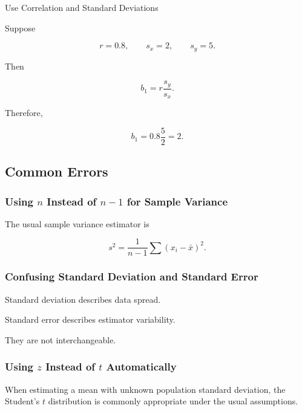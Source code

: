\begin{workedexamplebox}{Use Correlation and Standard Deviations}

Suppose

\[
r=0.8,
\qquad
s_x=2,
\qquad
s_y=5.
\]

Then

\[
b_1
=
r
\frac{s_y}{s_x}.
\]

Therefore,

\begin{answerbox}
\[
\boxed{
b_1
=
0.8
\frac52
=
2.
}
\]
\end{answerbox}

\end{workedexamplebox}

\subsection{Common Errors}
\label{subsec:statistical-tables-common-errors}

\subsubsection{Using \(n\) Instead of \(n-1\) for Sample Variance}

The usual sample variance estimator is

\[
\boxed{
s^2
=
\frac{
1
}{
n-1
}
\sum
(x_i-\bar{x})^2.
}
\]

\subsubsection{Confusing Standard Deviation and Standard Error}

Standard deviation describes data spread.

Standard error describes estimator variability.

They are not interchangeable.

\subsubsection{Using \(z\) Instead of \(t\) Automatically}

When estimating a mean with unknown population standard deviation, the
Student's \(t\) distribution is commonly appropriate under the usual
assumptions.

